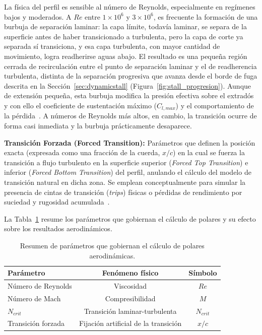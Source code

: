 La física del perfil es sensible al número de Reynolds, especialmente en regímenes bajos y moderados. A $Re$ entre $1 \times 10^6$ y $3 \times 10^6$, es frecuente la formación de una burbuja de separación laminar: la capa límite, todavía laminar, se separa de la superficie antes de haber transicionado a turbulenta, pero la capa de corte ya separada sí transiciona, y esa capa turbulenta, con mayor cantidad de movimiento, logra readherirse aguas abajo. El resultado es una pequeña región cerrada de recirculación entre el punto de separación laminar y el de readherencia turbulenta, distinta de la separación progresiva que avanza desde el borde de fuga descrita en la Sección~\ref{sec:dynamicstall} (Figura~\ref{fig:stall_progresion}). Aunque de extensión pequeña, esta burbuja modifica la presión efectiva sobre el extradós y con ello el coeficiente de sustentación máximo ($C_{l,max}$) y el comportamiento de la pérdida~\parencite{drela1989xfoil}. A números de Reynolds más altos, en cambio, la transición ocurre de forma casi inmediata y la burbuja prácticamente desaparece.

\textbf{Transición Forzada (Forced Transition):} Parámetros que definen la posición exacta (expresada como una fracción de la cuerda, $x/c$) en la cual se fuerza la transición a flujo turbulento en la superficie superior (\textit{Forced Top Transition}) e inferior (\textit{Forced Bottom Transition}) del perfil, anulando el cálculo del modelo de transición natural en dicha zona. Se emplean conceptualmente para simular la presencia de cintas de transición (\textit{trips}) físicas o pérdidas de rendimiento por suciedad y rugosidad acumulada~\parencite{drela1989xfoil}.

La Tabla~\ref{tab:resumen_params_polares} resume los parámetros que gobiernan el cálculo de polares y su efecto sobre los resultados aerodinámicos.

\begin{table}[H]
    \centering
    \caption{Resumen de parámetros que gobiernan el cálculo de polares aerodinámicas.}
    \label{tab:resumen_params_polares}
    \begin{tabular}{lcc}
        \hline
        \textbf{Parámetro} & \textbf{Fenómeno físico} & \textbf{Símbolo} \\
        \hline
        Número de Reynolds & Viscosidad & $Re$ \\
        Número de Mach & Compresibilidad & $M$ \\
        $N_{crit}$ & Transición laminar-turbulenta & $N_{crit}$ \\
        Transición forzada & Fijación artificial de la transición & $x/c$ \\
        \hline
    \end{tabular}
\end{table}


